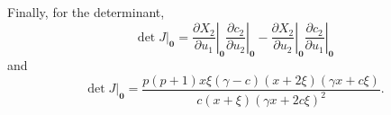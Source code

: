 \documentclass[11pt]{article}
\theoremstyle{definition}
\begin{document}
Finally, for the determinant,
$$
\det J\Big|_{\mathbf{0}}
= \left.\frac{\partial X_2}{\partial u_1}\right|_{\mathbf{0}}
\left.\frac{\partial c_2}{\partial u_2}\right|_{\mathbf{0}} - 
\left.\frac{\partial X_2}{\partial u_2}\right|_{\mathbf{0}}
\left.\frac{\partial c_2}{\partial u_1}\right|_{\mathbf{0}}
$$
and
$$\det J\Big|_{\mathbf{0}} = \frac{p (p+1) x \xi (\gamma - c) (x+2\xi) (\gamma x + c \xi)}{c (x + \xi) (\gamma x + 2 c \xi)^2}.$$
\end{document}

